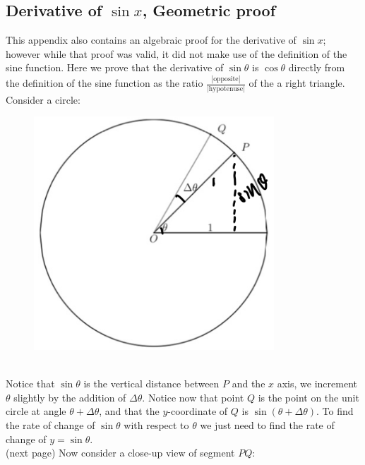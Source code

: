 \documentclass{report}
\begin{document}
\subsection{Derivative of $\sin x$, Geometric proof} %
This appendix also contains an algebraic proof for the derivative of $\sin x$; however while that
proof was valid, it did not make use of the definition of the sine function. Here we prove that
the derivative of $\sin\theta$ is $\cos\theta$ directly from the definition of the sine function 
as the ratio $\frac{|\text{opposite}|}{|\text{hypotenuse}|}$ of the a right triangle.
Consider a circle:
\begin{figure}[h]
\includegraphics[width=9cm]{Capture11}
\centering\\
\end{figure}\\
Notice that $\sin\theta$ is the vertical distance between $P$ and the $x$ axis,
we increment $\theta$ slightly by the addition of $\Delta\theta$.
Notice now that point $Q$ is the point on the unit 
circle at angle $\theta+\Delta\theta$, and that the $y$-coordinate of $Q$ is
$\sin(\theta+\Delta\theta)$. To find the rate of change of $\sin\theta$ with respect to $\theta$
we just need to find the rate of change of $y=\sin\theta$.\\
(next page)
\newpage
\noindent Now consider a close-up view of segment $PQ$:
\end{document}
